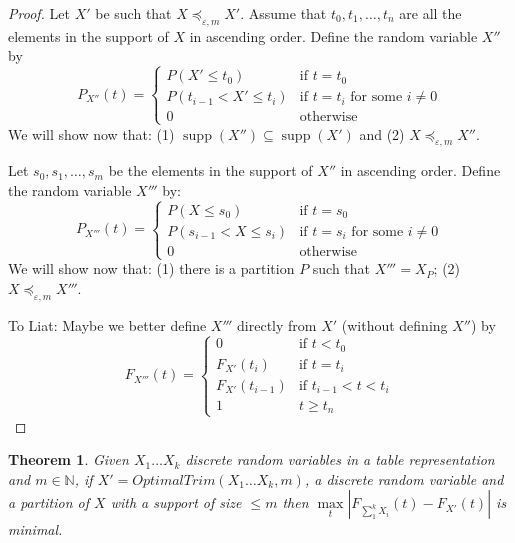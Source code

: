 \documentclass[review]{elsarticle}
\newtheorem{theorem}[lemma]{Theorem}
\DeclareMathOperator{\support}{supp}
\begin{document}
\begin{proof}
Let $X'$ be such that $X \preceq_{\varepsilon,m} X'$. Assume that $t_0,t_1,\dots,t_n$ are all the elements in the support of $X$ in ascending order. Define the random variable $X''$ by 
$$
P_{X''}(t) = \begin{cases}
P(X' \leq t_0)           & \text{if } t=t_0  \\ 
P(t_{i-1} < X' \leq t_i) & \text{if } t=t_i \text{ for some } i \neq 0 \\ 
0                        & \text{otherwise}
\end{cases}
$$
We will show now that: (1) $\support(X'') \subseteq \support(X')$ and (2) $X \preceq_{\varepsilon,m} X''$. 

Let $s_0,s_1,\dots,s_m$ be the elements in the support of $X''$ in ascending order. Define the random variable $X'''$ by:
$$
P_{X'''}(t) = \begin{cases}
P(X \leq s_0)           & \text{if } t=s_0  \\ 
P(s_{i-1} < X \leq s_i) & \text{if } t=s_i \text{ for some } i \neq 0 \\ 
0                       & \text{otherwise}
\end{cases}
$$
We will show now that: (1) there is a partition $P$ such that $X'''=X_P$; (2) $X \preceq_{\varepsilon,m} X'''$. 

To Liat: Maybe we better define $X'''$ directly from $X'$ (without defining $X''$) by 
	$$F_{X'''}(t)=\begin{cases}
	  0    & \text{if } t < t_0 \\
	  F_{X'}(t_i) & \text{if } t = t_i     \\
	  F_{X'}(t_{i-1})    & \text{if } t_{i-1} < t < t_i \\
	  1               & t \geq t_n
	\end{cases}$$
\end{proof}


\begin{theorem}
Given $X_1 \dots X_k$ discrete random variables in a table representation and $m \in \mathbb{N}$, if $X'=OptimalTrim(X_1 \dots X_k,m)$, a discrete random variable and a partition of $X$ with a support of size $\leq m$ then $\max\limits_{t}|F_{\sum_1^k X_i}(t)-F_{X'}(t)|$ is minimal.
\end{theorem}
\end{document}
